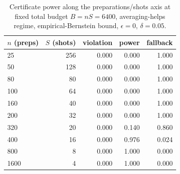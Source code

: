 \begin{table}[h]\centering\small
\begin{tabular}{lrrrr}
\toprule
$n$ (preps) & $S$ (shots) & violation & power & fallback \\
\midrule
25 & 256 & 0.000 & 0.000 & 1.000 \\
50 & 128 & 0.000 & 0.000 & 1.000 \\
80 & 80 & 0.000 & 0.000 & 1.000 \\
100 & 64 & 0.000 & 0.000 & 1.000 \\
160 & 40 & 0.000 & 0.000 & 1.000 \\
200 & 32 & 0.000 & 0.000 & 1.000 \\
320 & 20 & 0.000 & 0.140 & 0.860 \\
400 & 16 & 0.000 & 0.976 & 0.024 \\
800 & 8 & 0.000 & 1.000 & 0.000 \\
1600 & 4 & 0.000 & 1.000 & 0.000 \\
\bottomrule\end{tabular}
\caption{Certificate power along the preparations/shots axis at fixed total budget $B=nS=6400$, averaging-helps regime, empirical-Bernstein bound, $\epsilon=0$, $\delta=0.05$.}
\label{tab:frontier}
\end{table}
